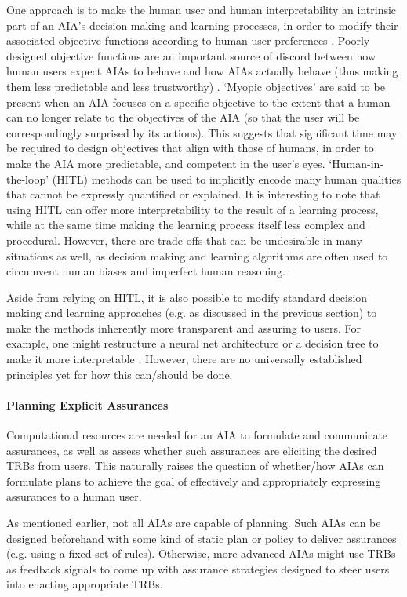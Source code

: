 One approach is to make the human user and human interpretability an intrinsic part of an AIA's decision making and learning processes, in order to modify their associated objective functions according to human user preferences \cite{Freitas2006-qo,Dragan2013-wd}. 
Poorly designed objective functions are an important source of discord between how human users expect AIAs to behave and how AIAs actually behave (thus making them less predictable and less trustworthy) \cite{Amodei2016-xi}. 
`Myopic objectives' are said to be present when an AIA focuses on a specific objective to the extent that a human can no longer relate to the objectives of the AIA (so that the user will be correspondingly surprised by its actions). This suggests that significant time may be required to design objectives that align with those of humans, in order to make the AIA more predictable, and competent in the user's eyes. 
%
`Human-in-the-loop' (HITL) methods can be used to implicitly encode many human qualities that cannot be expressly quantified or explained. 
It is interesting to note that using HITL can offer more interpretability to the result of a learning process, while at the same time making the learning process itself less complex and procedural. 
However, there are trade-offs that can be undesirable in many situations as well, as decision making and learning algorithms are often used to circumvent human biases and imperfect human reasoning. 

Aside from relying on HITL, it is also possible to modify standard decision making and learning approaches (e.g. as discussed in the previous section) to make the methods inherently more transparent and assuring to users. For example, one might restructure a neural net architecture or a decision tree to make it more interpretable \cite{Choi2016-by,Abdollahi2016-vn,Jovanovic2016-gw}. However, there are no universally established principles yet for how this can/should be done.

\paragraph{Planning Explicit Assurances} Computational resources are needed for an AIA to formulate and communicate assurances, as well as assess whether such assurances are eliciting the desired TRBs from users. This naturally raises the question of whether/how AIAs can formulate plans to achieve the goal of effectively and appropriately expressing assurances to a human user. 

As mentioned earlier, not all AIAs are capable of planning. 
Such AIAs can be designed beforehand with some kind of static plan or policy to deliver assurances (e.g. using a fixed set of rules). 
Otherwise, more advanced AIAs might use TRBs as feedback signals to come up with assurance strategies designed to steer users into enacting appropriate TRBs. 

